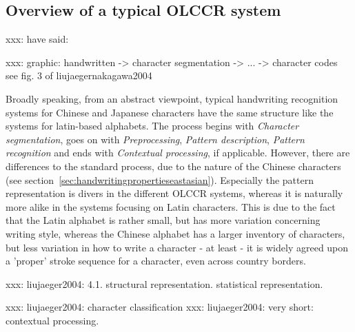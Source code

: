 \subsection{Overview of a typical OLCCR system}

xxx:  \cite{LiuJaegerNakagawa2004} have said: 

\cite{Keogh2001}
xxx:  graphic:
handwritten -> character segmentation -> ... -> character codes
see fig. 3 of liujaegernakagawa2004

Broadly speaking, from an abstract viewpoint, typical handwriting recognition 
systems for Chinese and Japanese characters have the same structure like the
systems for latin-based alphabets. The process begins with \emph{Character 
segmentation}, goes on with \emph{Preprocessing}, \emph{Pattern description}, 
\emph{Pattern recognition} and ends with \emph{Contextual processing}, 
if applicable. However, there are differences to the standard process, due to 
the nature of the Chinese characters (see 
section~\ref{sec:handwritingpropertieseastasian}).
Especially the pattern representation is divers in the different OLCCR systems,
whereas it is naturally more alike in the systems focusing on Latin characters.
This is due to the fact that the Latin alphabet is rather small, but has more
variation concerning writing style, whereas the Chinese alphabet has a larger 
inventory of characters, but less variation in how to write a character - at
least - it is widely agreed upon a 'proper' stroke sequence for a character,
even across country borders.

xxx: liujaeger2004: 4.1. structural representation. statistical representation.

xxx: liujaeger2004: character classification
xxx: liujaeger2004: very short: contextual processing.




